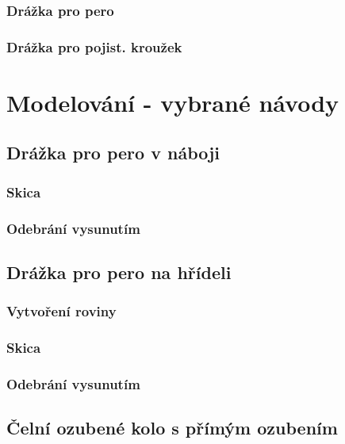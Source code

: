 \subsection{Drážka pro pero}

\subsection{Drážka pro pojist. kroužek}

\chapter{Modelování - vybrané návody}

\section{Drážka pro pero v náboji}

\subsection*{Skica}

\subsection*{Odebrání vysunutím}

\section{Drážka pro pero na hřídeli}

\subsection*{Vytvoření roviny}

\subsection*{Skica}

\subsection*{Odebrání vysunutím}

\section{Čelní ozubené kolo s přímým ozubením}

